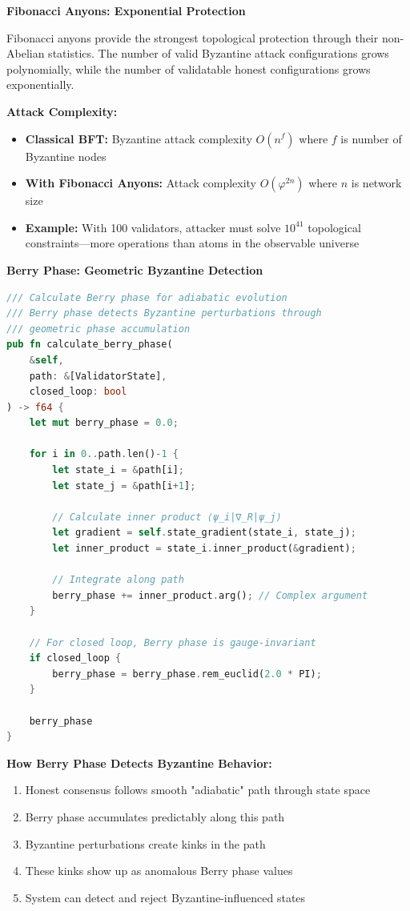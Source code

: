 \documentclass[11pt,a4paper]{article}
\begin{document}
\textbf{Fibonacci Anyons: Exponential Protection}

Fibonacci anyons provide the strongest topological protection through their non-Abelian statistics. The number of valid Byzantine attack configurations grows polynomially, while the number of validatable honest configurations grows exponentially.

\textbf{Attack Complexity:}
\begin{itemize}[leftmargin=*]
\item \textbf{Classical BFT:} Byzantine attack complexity $O(n^f)$ where $f$ is number of Byzantine nodes
\item \textbf{With Fibonacci Anyons:} Attack complexity $O(\varphi^{2n})$ where $n$ is network size
\item \textbf{Example:} With 100 validators, attacker must solve $10^{41}$ topological constraints—more operations than atoms in the observable universe
\end{itemize}

\textbf{Berry Phase: Geometric Byzantine Detection}

\begin{lstlisting}[language=Rust,caption={Berry Phase Calculation}]
/// Calculate Berry phase for adiabatic evolution
/// Berry phase detects Byzantine perturbations through
/// geometric phase accumulation
pub fn calculate_berry_phase(
    &self,
    path: &[ValidatorState],
    closed_loop: bool
) -> f64 {
    let mut berry_phase = 0.0;

    for i in 0..path.len()-1 {
        let state_i = &path[i];
        let state_j = &path[i+1];

        // Calculate inner product ⟨ψ_i|∇_R|ψ_j⟩
        let gradient = self.state_gradient(state_i, state_j);
        let inner_product = state_i.inner_product(&gradient);

        // Integrate along path
        berry_phase += inner_product.arg(); // Complex argument
    }

    // For closed loop, Berry phase is gauge-invariant
    if closed_loop {
        berry_phase = berry_phase.rem_euclid(2.0 * PI);
    }

    berry_phase
}
\end{lstlisting}

\textbf{How Berry Phase Detects Byzantine Behavior:}

\begin{enumerate}[leftmargin=*]
\item Honest consensus follows smooth "adiabatic" path through state space
\item Berry phase accumulates predictably along this path
\item Byzantine perturbations create kinks in the path
\item These kinks show up as anomalous Berry phase values
\item System can detect and reject Byzantine-influenced states
\end{enumerate}
\end{document}
